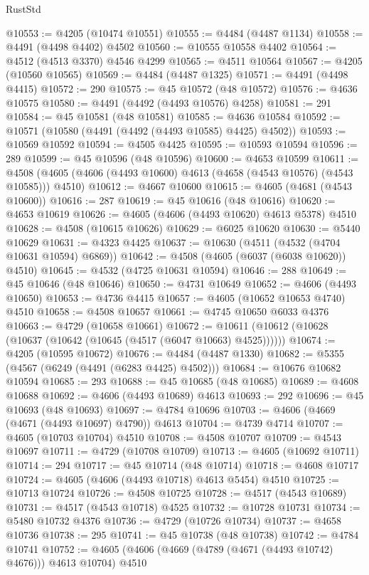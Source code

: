 \begin{lexlean}{RustStd}
\begin{coremodule}
@10553 := @4205 (@10474 @10551)
@10555 := @4484 (@4487 @1134)
@10558 := @4491 (@4498 @4402) @4502
@10560 := @10555 @10558 @4402
@10564 := @4512 (@4513 @3370) @4546 @4299
@10565 := @4511 @10564
@10567 := @4205 (@10560 @10565)
@10569 := @4484 (@4487 @1325)
@10571 := @4491 (@4498 @4415)
@10572 := 290
@10575 := @45 @10572 (@48 @10572)
@10576 := @4636 @10575
@10580 := @4491 (@4492 (@4493 @10576) @4258)
@10581 := 291
@10584 := @45 @10581 (@48 @10581)
@10585 := @4636 @10584
@10592 := @10571 (@10580 (@4491 (@4492 (@4493 @10585) @4425) @4502))
@10593 := @10569 @10592
@10594 := @4505 @4425
@10595 := @10593 @10594
@10596 := 289
@10599 := @45 @10596 (@48 @10596)
@10600 := @4653 @10599
@10611 := @4508 (@4605 (@4606 (@4493 @10600) @4613 (@4658 (@4543 @10576) (@4543 @10585))) @4510)
@10612 := @4667 @10600
@10615 := @4605 (@4681 (@4543 @10600))
@10616 := 287
@10619 := @45 @10616 (@48 @10616)
@10620 := @4653 @10619
@10626 := @4605 (@4606 (@4493 @10620) @4613 @5378) @4510
@10628 := @4508 (@10615 @10626)
@10629 := @6025 @10620
@10630 := @5440 @10629
@10631 := @4323 @4425
@10637 := @10630 (@4511 (@4532 (@4704 @10631 @10594) @6869))
@10642 := @4508 (@4605 (@6037 (@6038 @10620)) @4510)
@10645 := @4532 (@4725 @10631 @10594)
@10646 := 288
@10649 := @45 @10646 (@48 @10646)
@10650 := @4731 @10649
@10652 := @4606 (@4493 @10650)
@10653 := @4736 @4415
@10657 := @4605 (@10652 @10653 @4740) @4510
@10658 := @4508 @10657
@10661 := @4745 @10650 @6033 @4376
@10663 := @4729 (@10658 @10661)
@10672 := @10611 (@10612 (@10628 (@10637 (@10642 (@10645 (@4517 (@6047 @10663) @4525))))))
@10674 := @4205 (@10595 @10672)
@10676 := @4484 (@4487 @1330)
@10682 := @5355 (@4567 (@6249 (@4491 (@6283 @4425) @4502)))
@10684 := @10676 @10682 @10594
@10685 := 293
@10688 := @45 @10685 (@48 @10685)
@10689 := @4608 @10688
@10692 := @4606 (@4493 @10689) @4613
@10693 := 292
@10696 := @45 @10693 (@48 @10693)
@10697 := @4784 @10696
@10703 := @4606 (@4669 (@4671 (@4493 @10697) @4790)) @4613
@10704 := @4739 @4714
@10707 := @4605 (@10703 @10704) @4510
@10708 := @4508 @10707
@10709 := @4543 @10697
@10711 := @4729 (@10708 @10709)
@10713 := @4605 (@10692 @10711)
@10714 := 294
@10717 := @45 @10714 (@48 @10714)
@10718 := @4608 @10717
@10724 := @4605 (@4606 (@4493 @10718) @4613 @5454) @4510
@10725 := @10713 @10724
@10726 := @4508 @10725
@10728 := @4517 (@4543 @10689)
@10731 := @4517 (@4543 @10718) @4525
@10732 := @10728 @10731
@10734 := @5480 @10732 @4376
@10736 := @4729 (@10726 @10734)
@10737 := @4658 @10736
@10738 := 295
@10741 := @45 @10738 (@48 @10738)
@10742 := @4784 @10741
@10752 := @4605 (@4606 (@4669 (@4789 (@4671 (@4493 @10742) @4676))) @4613 @10704) @4510

\end{coremodule}
\end{lexlean}
